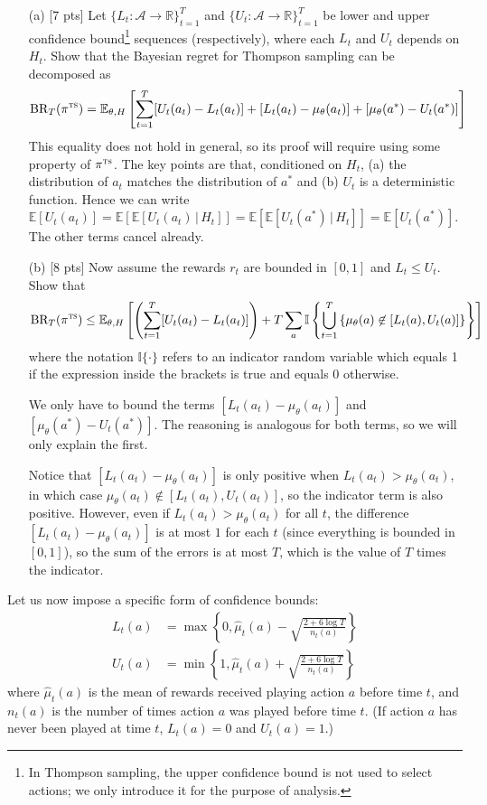 \documentclass[11pt]{article}
\newcommand{\E}{\mathbb E}
\newcommand{\Ex}{\mathbb E}
\newcommand{\given}{\,|\,}
\newcommand{\R}{\mathbb{R}}
\newcommand{\cA}{\mathcal{A}}
\newcommand{\piTS}{\pi^{\textsc{ts}}}
\newcommand{\solution}[1]{{\color{red} #1}}
\begin{document}
\begin{enumerate}
\item[(a)]
[7 pts]
Let $\{L_t : \cA \to \R\}_{t=1}^T$ and $\{U_t : \cA \to \R\}_{t=1}^T$ be lower and upper confidence bound\footnote{In Thompson sampling, the upper confidence bound is not used to select actions; we only introduce it for the purpose of analysis.} sequences (respectively), where each $L_t$ and $U_t$ depends on $H_t$.
Show that the Bayesian regret for Thompson sampling can be decomposed as
\begin{equation}
\text{BR}_T(\piTS) = \E_{\theta, H}\left[\sum_{t=1}^T [U_t(a_t) - L_t(a_t)] + [L_t(a_t) - \mu_\theta(a_t)] + [\mu_\theta(a^*) - U_t(a^*)]\right]
\end{equation}
This equality does not hold in general, so its proof will require using some property of $\piTS$.
\solution{
The key points are that, conditioned on $H_t$, (a) the distribution of $a_t$ matches the distribution of $a^*$ and (b) $U_t$ is a deterministic function. Hence we can write $\Ex[U_t(a_t)] = \Ex[\Ex[U_t(a_t) \given H_t]] = \Ex[\Ex[U_t(a^*) \given H_t]] = \Ex[U_t(a^*)]$. The other terms cancel already.
}

\item[(b)]
[8 pts]
Now assume the rewards $r_t$ are bounded in $[0,1]$ and $L_t \le U_t$. Show that
\begin{equation}
\text{BR}_T(\piTS) \le \E_{\theta, H}\left[\left(\sum_{t=1}^T [U_t(a_t) - L_t(a_t)]\right) + T \sum_{a} \mathbb{I} \left\{\bigcup_{t=1}^T \left\{ \mu_\theta(a) \not \in [L_t(a), U_t(a)] \right\}\right\} \right]
\end{equation}
where the notation $\mathbb{I}\{\cdot\}$ refers to an indicator random variable which equals 1 if the expression inside the brackets is true and equals 0 otherwise.

\solution{
We only have to bound the terms $[L_t(a_t) - \mu_\theta(a_t)]$ and $[\mu_\theta(a^*) - U_t(a^*)]$. The reasoning is analogous for both terms, so we will only explain the first.

Notice that $[L_t(a_t) - \mu_\theta(a_t)]$ is only positive when $L_t(a_t) > \mu_\theta(a_t)$, in which case $\mu_\theta(a_t) \not \in [L_t(a_t), U_t(a_t)]$, so the indicator term is also positive. However, even if $L_t(a_t) > \mu_\theta(a_t)$ for all $t$, the difference $[L_t(a_t) - \mu_\theta(a_t)]$ is at most $1$ for each $t$ (since everything is bounded in $[0,1]$), so the sum of the errors is at most $T$, which is the value of $T$ times the indicator.
}

\end{enumerate}
Let us now impose a specific form of confidence bounds:
\begin{align}
L_t(a) &= \max \left\{0, \hat\mu_t(a) - \sqrt{\frac{2 + 6\log T}{n_t(a)}}\right\} \\
U_t(a) &= \min \left\{1, \hat\mu_t(a) + \sqrt{\frac{2 + 6\log T}{n_t(a)}}\right\}
\end{align}
where $\hat\mu_t(a)$ is the mean of rewards received playing action $a$ before time $t$, and $n_t(a)$ is the number of times action $a$ was played before time $t$.
(If action $a$ has never been played at time $t$, $L_t(a) = 0$ and $U_t(a) = 1$.)
\end{document}
